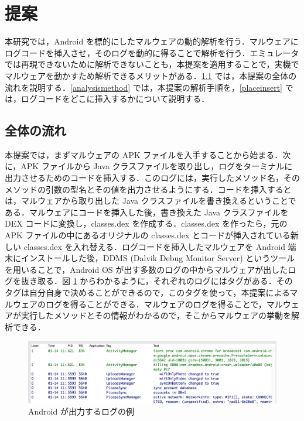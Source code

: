 \section{提案}
本研究では，Android を標的にしたマルウェアの動的解析を行う．マルウェアにログコードを挿入させ，そのログを動的に得ることで解析を行う．エミュレータでは再現できないために解析できないことも，本提案を適用することで，実機でマルウェアを動かすため解析できるメリットがある．\ref{overview} では，本提案の全体の流れを説明する．\ref{analysismethod} では，本提案の解析手順を，\ref{placeinsert} では，ログコードをどこに挿入するかについて説明する．

\subsection{全体の流れ}
\label{overview}
本提案では，まずマルウェアの APK ファイルを入手することから始まる．次に，APK ファイルから Java クラスファイルを取り出し，ログをターミナルに出力させるためのコードを挿入する．このログには，実行したメソッド名，そのメソッドの引数の型名とその値を出力させるようにする．コードを挿入するとは，マルウェアから取り出した Java クラスファイルを書き換えるということである．マルウェアにコードを挿入した後，書き換えた Java クラスファイルを DEX コードに変換し，classes.dex を作成する．classes.dex を作ったら，元の APK ファイルの中にあるオリジナルの classes.dex とコードが挿入されている新しい classes.dex を入れ替える．ログコードを挿入したマルウェアを Android 端末にインストールした後，DDMS (Dalvik Debug Monitor Server) というツールを用いることで，Android OS が出す多数のログの中からマルウェアが出したログを抜き取る．図 \ref{examplelog} からわかるように，それぞれのログにはタグがある．そのタグは自分自身で決めることができるので，このタグを使って，本提案によるマルウェアのログを得ることができる．マルウェアのログを得ることで，マルウェアが実行したメソッドとその情報がわかるので，そこからマルウェアの挙動を解析できる．

\begin{figure}[t]
\begin{center}
\includegraphics[scale=0.2]{androidlogexample.eps}
\end{center}
\caption{Android が出力するログの例}
\label{examplelog}
\end{figure}

